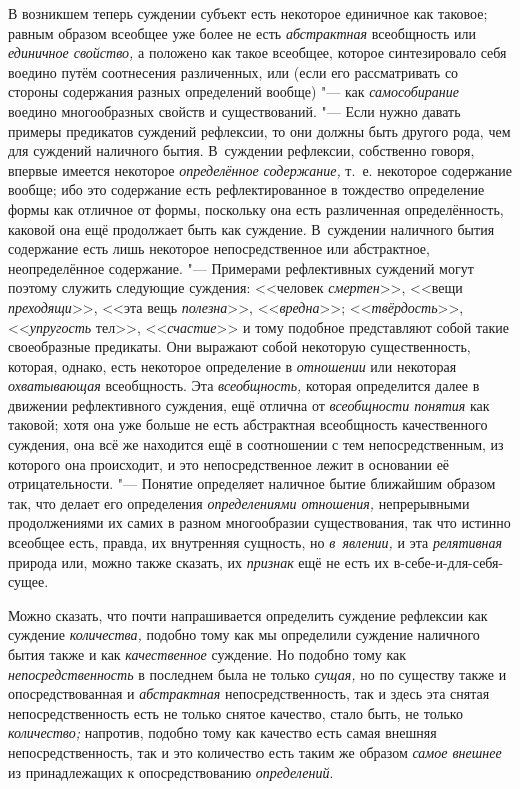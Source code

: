 В возникшем теперь суждении субъект есть некоторое единичное как таковое;
равным образом всеобщее уже более не есть {\em абстрактная} всеобщность или
{\em единичное свойство,} а положено как такое всеобщее, которое синтезировало
себя воедино путём соотнесения различенных, или (если его рассматривать со
стороны содержания разных определений вообще) "--- как {\em самособирание}
воедино многообразных свойств и существований. "--- Если нужно давать примеры
предикатов суждений рефлексии, то они должны быть другого рода, чем для
суждений наличного бытия. В~суждении рефлексии, собственно говоря, впервые
имеется некоторое {\em определённое содержание,}
т.~е. некоторое содержание вообще; ибо это содержание есть
рефлектированное в тождество определение формы как отличное от формы,
поскольку она есть различенная определённость, каковой она ещё продолжает
быть как суждение. В~суждении наличного бытия содержание есть лишь
некоторое непосредственное или абстрактное, неопределённое содержание. "---
Примерами рефлективных суждений могут поэтому служить следующие суждения:
<<человек {\em смертен}>>, <<вещи {\em преходящи}>>, <<эта вещь
{\em полезна}>>, <<{\em вредна}>>; <<{\em твёрдость}>>, <<{\em упругость}
тел>>, <<{\em счастие}>> и тому подобное представляют собой такие своеобразные
предикаты. Они выражают собой некоторую существенность, которая, однако, есть
некоторое определение в {\em отношении} или некоторая {\em охватывающая}
всеобщность. Эта {\em всеобщность,} которая определится далее в движении
рефлективного суждения, ещё отлична от {\em всеобщности понятия} как таковой;
хотя она уже больше не есть абстрактная всеобщность качественного суждения, она
всё же находится ещё в соотношении с тем непосредственным, из которого она
происходит, и это непосредственное лежит в основании её отрицательности. "---
Понятие определяет наличное бытие ближайшим образом так, что делает его
определения {\em определениями отношения,} непрерывными продолжениями их самих
в разном многообразии существования, так что истинно всеобщее есть, правда, их
внутренняя сущность, но {\em в~явлении,} и эта {\em релятивная} природа или,
можно также сказать, их {\em признак} ещё не есть их в-себе-и-для-себя-сущее.

Можно сказать, что почти напрашивается определить суждение рефлексии как
суждение {\em количества,} подобно тому как мы определили суждение наличного
бытия также и как {\em качественное} суждение. Но подобно тому как
{\em непосредственность} в последнем была не только {\em сущая,} но по существу
также и опосредствованная и {\em абстрактная} непосредственность, так и здесь
эта снятая непосредственность есть не только снятое качество, стало быть, не
только {\em количество;} напротив, подобно тому как качество есть самая внешняя
непосредственность, так и это количество есть таким же образом
{\em самое внешнее} из принадлежащих к опосредствованию {\em определений}.

